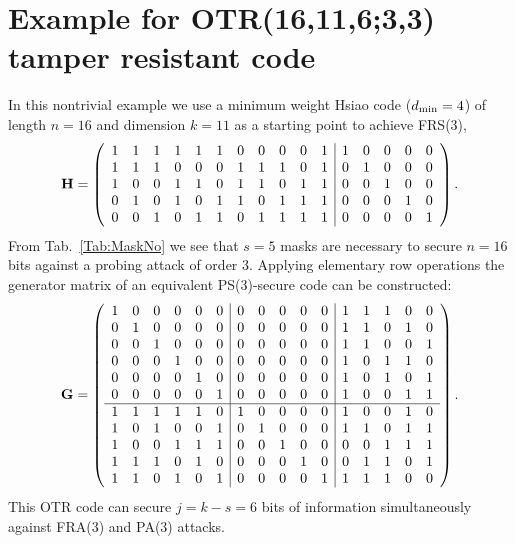 \documentclass[11pt]{llncs}
\newcommand{\BE}{\begin{equation}}      \newcommand{\EE}{\end{equation}}
\begin{document}
\section{Example for OTR(16,11,6;3,3) tamper resistant code}\label{App:OTR_Example2}
In this nontrivial example
we use a minimum weight Hsiao code ($d_\text{min}=4$)
of length $n=16$ and dimension $k=11$
as a starting point to achieve FRS(3),
\BE
\V H =
  \left(\begin{array}{ccccccccccc|ccccc}
  1 & 1 & 1 & 1 & 1 & 1 & 0 & 0 & 0 & 0 & 1 &  1 & 0 & 0 & 0 & 0\\
  1 & 1 & 1 & 0 & 0 & 0 & 1 & 1 & 1 & 0 & 1 &  0 & 1 & 0 & 0 & 0\\
  1 & 0 & 0 & 1 & 1 & 0 & 1 & 1 & 0 & 1 & 1 &  0 & 0 & 1 & 0 & 0\\
  0 & 1 & 0 & 1 & 0 & 1 & 1 & 0 & 1 & 1 & 1 &  0 & 0 & 0 & 1 & 0\\
  0 & 0 & 1 & 0 & 1 & 1 & 0 & 1 & 1 & 1 & 1 &  0 & 0 & 0 & 0 & 1
 \end{array}\right).
\EE
From Tab.\ \ref{Tab:MaskNo} we see that $s=5$ masks are necessary
to secure $n=16$ bits against a probing attack of order 3.
Applying elementary row operations the generator matrix of
an equivalent PS(3)-secure code can be constructed:
\BE
\V G =
  \left(\begin{array}{cccccc|ccccc|ccccc}
  1 & 0 & 0 & 0 & 0 & 0 &  0 & 0 & 0 & 0 & 0 &  1 & 1 & 1 & 0 & 0  \\
  0 & 1 & 0 & 0 & 0 & 0 &  0 & 0 & 0 & 0 & 0 &  1 & 1 & 0 & 1 & 0  \\
  0 & 0 & 1 & 0 & 0 & 0 &  0 & 0 & 0 & 0 & 0 &  1 & 1 & 0 & 0 & 1  \\
  0 & 0 & 0 & 1 & 0 & 0 &  0 & 0 & 0 & 0 & 0 &  1 & 0 & 1 & 1 & 0  \\
  0 & 0 & 0 & 0 & 1 & 0 &  0 & 0 & 0 & 0 & 0 &  1 & 0 & 1 & 0 & 1  \\
  0 & 0 & 0 & 0 & 0 & 1 &  0 & 0 & 0 & 0 & 0 &  1 & 0 & 0 & 1 & 1  \\
  \hline
  1 & 1 & 1 & 1 & 1 & 0 &  1 & 0 & 0 & 0 & 0 &  1 & 0 & 0 & 1 & 0  \\
  1 & 0 & 1 & 0 & 0 & 1 &  0 & 1 & 0 & 0 & 0 &  1 & 1 & 0 & 1 & 1  \\
  1 & 0 & 0 & 1 & 1 & 1 &  0 & 0 & 1 & 0 & 0 &  0 & 0 & 1 & 1 & 1  \\
  1 & 1 & 1 & 0 & 1 & 0 &  0 & 0 & 0 & 1 & 0 &  0 & 1 & 1 & 0 & 1  \\
  1 & 1 & 0 & 1 & 0 & 1 &  0 & 0 & 0 & 0 & 1 &  1 & 1 & 1 & 0 & 0
\end{array}\right).
\EE
This OTR code can secure $j = k - s = 6$ bits of information
simultaneously against FRA(3) and PA(3) attacks.
\end{document}
